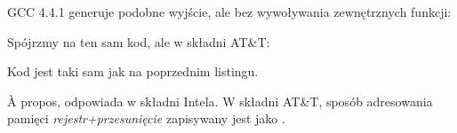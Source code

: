 
GCC 4.4.1 generuje podobne wyjście, ale bez wywoływania zewnętrznych funkcji:




Spójrzmy na ten sam kod, ale w składni AT\&T:



\myindex{\ATTSyntax}
Kod jest taki sam jak na poprzednim listingu.

À propos,  odpowiada  w składni Intela.
W składni AT\&T, sposób adresowania pamięci \emph{rejestr+przesunięcie} zapisywany jest jako .



